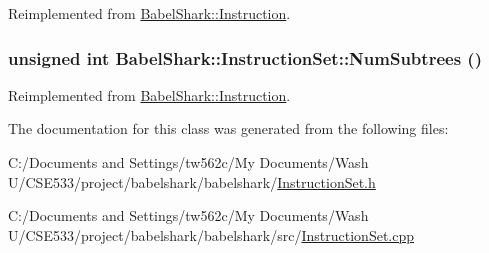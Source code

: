 Reimplemented from \hyperlink{class_babel_shark_1_1_instruction_bfbceb493d151b2e255c7c8cbac7a476}{BabelShark::Instruction}.\hypertarget{class_babel_shark_1_1_instruction_set_663c141979af83f6b7e5188d0d105fad}{
\subsubsection[{NumSubtrees}]{\setlength{\rightskip}{0pt plus 5cm}unsigned int BabelShark::InstructionSet::NumSubtrees ()}}
\label{class_babel_shark_1_1_instruction_set_663c141979af83f6b7e5188d0d105fad}




Reimplemented from \hyperlink{class_babel_shark_1_1_instruction_da0c4af8c73c7aae8b8d3a32a09f11e4}{BabelShark::Instruction}.

The documentation for this class was generated from the following files:\begin{CompactItemize}
\item 
C:/Documents and Settings/tw562c/My Documents/Wash U/CSE533/project/babelshark/babelshark/\hyperlink{_instruction_set_8h}{InstructionSet.h}\item 
C:/Documents and Settings/tw562c/My Documents/Wash U/CSE533/project/babelshark/babelshark/src/\hyperlink{_instruction_set_8cpp}{InstructionSet.cpp}\end{CompactItemize}
